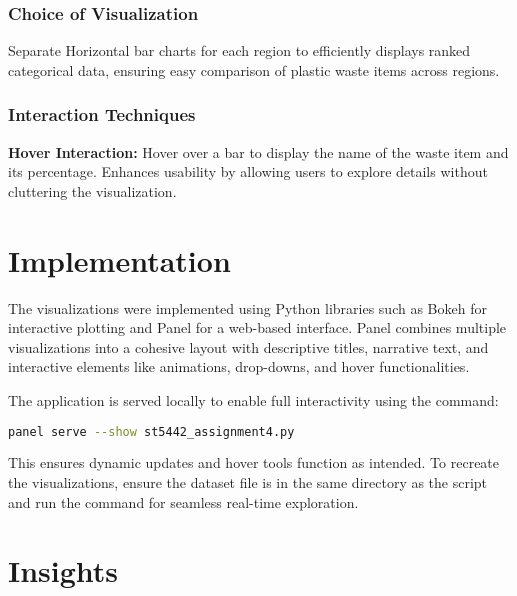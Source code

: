 \documentclass{article}
\begin{document}
\subsubsection{Choice of Visualization}
Separate Horizontal bar charts for each region to efficiently displays ranked categorical data, ensuring easy comparison of plastic waste items across regions.

\subsubsection{Interaction Techniques}
    \textbf{Hover Interaction:} Hover over a bar to display the name of the waste item and its percentage. Enhances usability by allowing users to explore details without cluttering the visualization.

\section{Implementation}
The visualizations were implemented using Python libraries such as Bokeh for interactive plotting and Panel for a web-based interface. Panel combines multiple visualizations into a cohesive layout with descriptive titles, narrative text, and interactive elements like animations, drop-downs, and hover functionalities.

The application is served locally to enable full interactivity using the command:

\begin{lstlisting}[language=bash]
panel serve --show st5442_assignment4.py
\end{lstlisting}

This ensures dynamic updates and hover tools function as intended. To recreate the visualizations, ensure the dataset file is in the same directory as the script and run the command for seamless real-time exploration.

\section{Insights}
\end{document}
